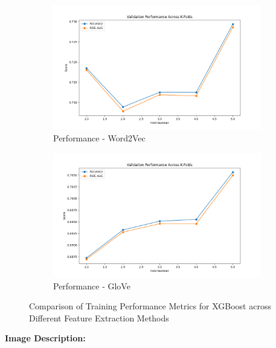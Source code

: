 \begin{figure}[H]
    \begin{subfigure}[b]{0.47\textwidth}
        \includegraphics[width=\textwidth]{img/report_info/img/1.3.XGB/best_xgboost_word2vec.png}
        \caption{Performance - Word2Vec}
        \label{fig:lr-word2vec}
    \end{subfigure}
    \begin{subfigure}[b]{0.47\textwidth}
        \includegraphics[width=\textwidth]{img/report_info/img/1.3.XGB/best_xgboost_glove.png}
        \caption{Performance - GloVe}
        \label{fig:lr-glove}
    \end{subfigure}
    
    \caption{Comparison of Training Performance Metrics for XGBoost across Different Feature Extraction Methods}
    \label{fig:lr-performance-group}
\end{figure}

\textbf{Image Description:}

